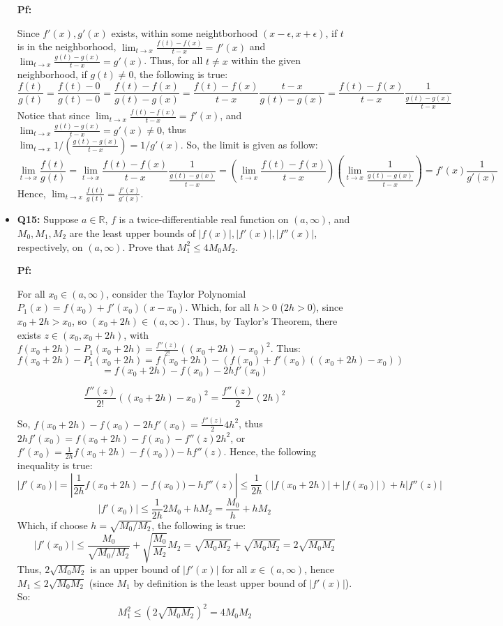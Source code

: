 \documentclass{article}
\begin{document}
\begin{itemize}
    \textbf{Pf:}

    Since $f'(x), g'(x)$ exists, within some neightborhood $(x-\epsilon,x+\epsilon)$, if $t$ is in the neighborhood, $\lim_{t\rightarrow x}\frac{f(t)-f(x)}{t-x}=f'(x)$ and $\lim_{t\rightarrow x}\frac{g(t)-g(x)}{t-x}=g'(x)$.
    Thus, for all $t\neq x$ within the given neighborhood, if $g(t)\neq 0$, the following is true:
    $$\frac{f(t)}{g(t)}=\frac{f(t)-0}{g(t)-0}=\frac{f(t)-f(x)}{g(t)-g(x)} = \frac{f(t)-f(x)}{t-x}\frac{t-x}{g(t)-g(x)} = \frac{f(t)-f(x)}{t-x}\frac{1}{\frac{g(t)-g(x)}{t-x}}$$
    Notice that since $\lim_{t\rightarrow x}\frac{f(t)-f(x)}{t-x}=f'(x)$, and $\lim_{t\rightarrow x}\frac{g(t)-g(x)}{t-x}=g'(x)\neq 0$, thus $\lim_{t\rightarrow x}1/\left(\frac{g(t)-g(x)}{t-x}\right)=1/g'(x)$. So, the limit is given as follow:
    $$\lim_{t\rightarrow x}\frac{f(t)}{g(t)}= \lim_{t\rightarrow x}\frac{f(t)-f(x)}{t-x}\frac{1}{\frac{g(t)-g(x)}{t-x}} = \left(\lim_{t\rightarrow x}\frac{f(t)-f(x)}{t-x}\right)\left(\lim_{t\rightarrow x}\frac{1}{\frac{g(t)-g(x)}{t-x}}\right) = f'(x)\frac{1}{g'(x)}$$
    Hence, $\lim_{t\rightarrow x}\frac{f(t)}{g(t)}=\frac{f'(x)}{g'(x)}$.

    \hfill

    \item \begin{myBox}[]{}
        \textbf{Q15:} Suppose $a\in\mathbb{R}$, $f$ is a twice-differentiable real function on $(a,\infty)$, and $M_0,M_1,M_2$ are the least upper bounds of $|f(x)|,|f'(x)|,|f''(x)|$, respectively, on $(a,\infty)$. 
        Prove that $M_1^2\leq 4M_0M_2$.
    \end{myBox}

    \textbf{Pf:}

    For all $x_0\in (a,\infty)$, consider the Taylor Polynomial $P_1(x)=f(x_0)+f'(x_0)(x-x_0)$. Which, for all $h>0$ ($2h>0$), since $x_0+2h>x_0$, so $(x_0+2h)\in (a,\infty)$. 
    Thus, by Taylor's Theorem, there exists $z\in (x_0,x_0+2h)$, with $f(x_0+2h)-P_1(x_0+2h)=\frac{f''(z)}{2!}((x_0+2h)-x_0)^2$. Thus:
    $$f(x_0+2h)-P_1(x_0+2h)=f(x_0+2h)-\left(f(x_0)+f'(x_0)((x_0+2h)-x_0)\right)$$
    $$=f(x_0+2h)-f(x_0)-2hf'(x_0)$$

    $$\frac{f''(z)}{2!}((x_0+2h)-x_0)^2 = \frac{f''(z)}{2}(2h)^2$$

    So, $f(x_0+2h)-f(x_0)-2hf'(x_0)=\frac{f''(z)}{2}4h^2$, thus $2hf'(x_0)=f(x_0+2h)-f(x_0)-f''(z)2h^2$, or $f'(x_0)=\frac{1}{2h}f(x_0+2h)-f(x_0))-hf''(z)$. Hence, the following inequality is true:
    $$|f'(x_0)| = \left|\frac{1}{2h}f(x_0+2h)-f(x_0))-hf''(z)\right| \leq \frac{1}{2h}(|f(x_0+2h)|+|f(x_0)|) + h|f''(z)|$$
    $$|f'(x_0)| \leq \frac{1}{2h}2M_0 + hM_2 = \frac{M_0}{h}+hM_2$$
    Which, if choose $h=\sqrt{M_0/M_2}$, the following is true:
    $$|f'(x_0)| \leq \frac{M_0}{\sqrt{M_0/M_2}}+\sqrt{\frac{M_0}{M_2}}M_2 = \sqrt{M_0M_2}+\sqrt{M_0M_2}=2\sqrt{M_0M_2}$$
    Thus, $2\sqrt{M_0M_2}$ is an upper bound of $|f'(x)|$ for all $x\in(a,\infty)$, hence $M_1\leq 2\sqrt{M_0M_2}$ (since $M_1$ by definition is the least upper bound of $|f'(x)|$). So:
    $$M_1^2 \leq (2\sqrt{M_0M_2})^2 = 4M_0M_2$$


\end{itemize}
\end{document}
